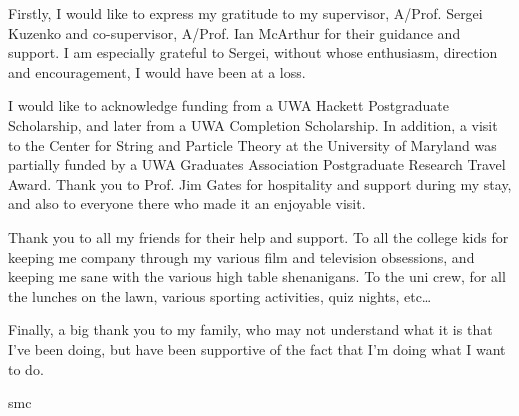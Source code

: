 \begin{acknowledgements}

\noindent Firstly, I would like to express my gratitude to my supervisor, A/Prof. Sergei Kuzenko and co-supervisor, A/Prof. Ian McArthur for their guidance and support. I am especially grateful to Sergei, without whose enthusiasm, direction and encouragement, I would have been at a loss.

I would like to acknowledge funding from a UWA Hackett Postgraduate Scholarship, and later from a UWA Completion Scholarship. In addition, a visit to the Center for String and Particle Theory at the University of Maryland was partially funded by a UWA Graduates Association Postgraduate Research Travel Award. Thank you to Prof. Jim Gates for hospitality and support during my stay, and also to everyone there who made it an enjoyable visit.

Thank you to all my friends for their help and support. To all the college kids for keeping me company through my various film and television obsessions, and keeping me sane with the various high table shenanigans. To the uni crew, for all the lunches on the lawn, various sporting activities, quiz nights, etc\dots

Finally, a big thank you to my family, who may not understand what it is that I've been doing, but have been supportive of the fact that I'm doing what I want to do.

\vskip0.5cm
\noindent
smc
\end{acknowledgements}
